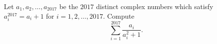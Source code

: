 Let $a_1,a_2,\ldots,a_{2017}$ be the $2017$ distinct complex numbers which satisfy $a_i^{2017}=a_i+1$ for $i=1,2,\ldots,2017$. Compute $$\displaystyle\sum_{i=1}^{2017}\frac{a_i}{a_i^2+1}.$$
